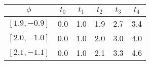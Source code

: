 \begin{tabular}{c*{5}{|c}}
    $\phi$ &  $t_0$ & $t_1$ & $t_2$ & $t_3$ & $t_4$ \\ \hline
    $[1.9,-0.9]$ & 0.0 & 1.0 & 1.9 & 2.7 & 3.4 \\
    $[2.0,-1.0]$ & 0.0 & 1.0 & 2.0 & 3.0 & 4.0 \\
    $[2.1,-1.1]$ & 0.0 & 1.0 & 2.1 & 3.3 & 4.6 
\end{tabular}